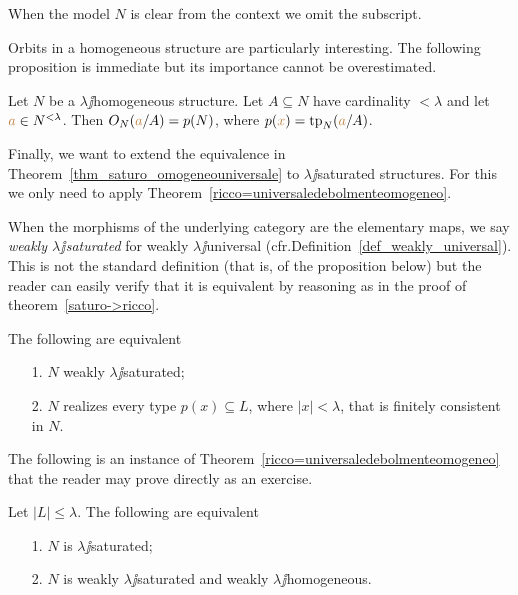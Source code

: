\documentclass[creche.tex]{subfiles}
\begin{document}
When the model $N$ is clear from the context we omit the subscript.

Orbits in a homogeneous structure are particularly interesting. The following proposition is immediate but its importance cannot be overestimated.

\begin{proposition}\label{omogeneitaorbitetipi}
Let $N$ be a $\lambda\jj$homogeneous structure. Let $A\subseteq N$ have cardinality $<\lambda$ and let ${\color{brown} a}\in N^{<\lambda}$. Then $O_N({\color{brown} a}/A)=p(N)$, where $p({\color{brown} x})={\rm tp}_N({\color{brown} a}/A)$.\QED
\end{proposition}


Finally, we want to extend the equivalence in Theorem~\ref{thm_saturo_omogeneouniversale} to $\lambda\jj$saturated structures. For this we only need to apply Theorem~\ref{ricco=universaledebolmenteomogeneo}. 

When the morphisms of the underlying category are the elementary maps, we say \emph{weakly $\lambda\jj$saturated} for weakly $\lambda\jj$universal (cfr.\@ Definition~\ref{def_weakly_universal}). This is not the standard definition (that is,  of the proposition below) but the reader can easily verify that it is equivalent by reasoning as in the proof of theorem~\ref{saturo->ricco}.

\begin{proposition}\label{prop_w_saturation}
The following are equivalent
\begin{itemize}
\item[1.] $N$ weakly $\lambda\jj$saturated;
\item[2.] $N$ realizes every type $p(x)\subseteq L$, where $|x|<\lambda$, that is finitely consistent in $N$.\QED
\end{itemize}
\end{proposition}

The following is an instance of Theorem~\ref{ricco=universaledebolmenteomogeneo} that the reader may prove directly as an exercise.

\begin{corollary}\label{saturo=universaledebolmenteomogeneo}
Let $|L|\le\lambda$. The following are equivalent\nobreak
\begin{itemize}
\item[1.] $N$ is $\lambda\jj$saturated;
\item[2.] $N$ is weakly $\lambda\jj$saturated and weakly $\lambda\jj$homogeneous.\QED
\end{itemize}
\end{corollary}
\end{document}
